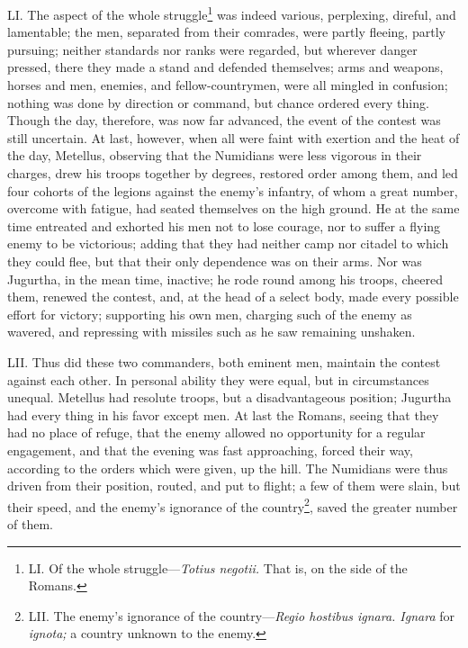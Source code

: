 LI. The aspect of the whole struggle\footnote{LI. Of the whole struggle—\emph{Totius negotii.} That is, on the side
of the Romans.} was indeed various,
perplexing, direful, and lamentable; the men, separated from their
comrades, were partly fleeing, partly pursuing; neither standards nor
ranks were regarded, but wherever danger pressed, there they made a
stand and defended themselves; arms and weapons, horses and men,
enemies, and fellow-countrymen, were all mingled in confusion; nothing
was done by direction or command, but chance ordered every thing.
Though the day, therefore, was now far advanced, the event of the
contest was still uncertain. At last, however, when all were faint
with exertion and the heat of the day, Metellus, observing that the
Numidians were less vigorous in their charges, drew his troops
together by degrees, restored order among them, and led four cohorts
of the legions against the enemy's infantry, of whom a great number,
overcome with fatigue, had seated themselves on the high ground. He at
the same time entreated and exhorted his men not to lose courage, nor
to suffer a flying enemy to be victorious; adding that they had
neither camp nor citadel to which they could flee, but that their only
dependence was on their arms. Nor was Jugurtha, in the mean time,
inactive; he rode round among his troops, cheered them, renewed the
contest, and, at the head of a select body, made every possible effort
for victory; supporting his own men, charging such of the enemy as
wavered, and repressing with missiles such as he saw remaining
unshaken.

LII. Thus did these two commanders, both eminent men, maintain the
contest against each other. In personal ability they were equal, but
in circumstances unequal. Metellus had resolute troops, but a
disadvantageous position; Jugurtha had every thing in his favor except
men. At last the Romans, seeing that they had no place of refuge, that
the enemy allowed no opportunity for a regular engagement, and that
the evening was fast approaching, forced their way, according to the
orders which were given, up the hill. The Numidians were thus driven
from their position, routed, and put to flight; a few of them were
slain, but their speed, and the enemy's ignorance of the country\footnote{LII. The enemy's ignorance of the country—\emph{Regio hostibus ignara.
Ignara} for \emph{ignota;} a country unknown to the enemy.},
saved the greater number of them.

